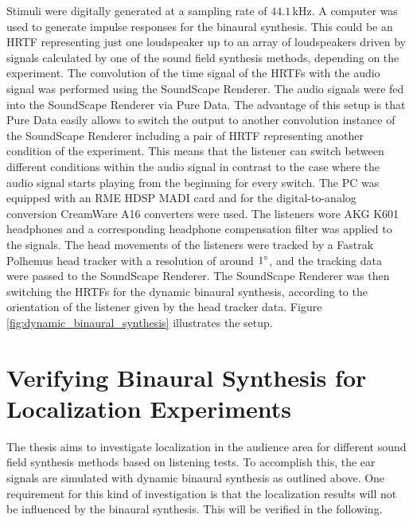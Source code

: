 Stimuli were digitally generated at a sampling rate of $44.1$\,kHz.
A computer was used to
generate impulse responses for the binaural synthesis. This could be an \ac{HRTF}
representing just one loudspeaker up to an array of loudspeakers driven by
signals calculated by one of the sound field synthesis methods,
depending on the experiment.
The convolution of the time signal of the \acp{HRTF} with
the audio signal was performed using the SoundScape
Renderer.\autocite[The \href{http://spatialaudio.net/ssr/}{\color{link}SoundScape
Renderer} is an open source software and is described in][]{Geier2008}
The audio signals were fed into the SoundScape Renderer via Pure
Data.\autocite[\href{http://puredata.info/}{\color{link}Pure Data} is an open
source software and first described in][]{Puckette1996}
The advantage of this setup is that Pure Data easily allows
to switch the output to another convolution instance of the SoundScape Renderer
including a pair of \ac{HRTF} representing another condition of the experiment. This
means that the listener can switch between different conditions within the
audio signal in contrast to the case where the audio signal starts playing from
the beginning for every switch.
The {\small PC} was equipped with an {\small RME HDSP MADI} card and for the
digital-to-analog conversion CreamWare A16 converters were used.
The listeners wore {\small AKG K601} headphones and a corresponding
headphone compensation filter was applied to the signals.
The head movements of the listeners were tracked by a Fastrak
Polhemus head tracker with a resolution of around $1^\circ$, and the tracking
data were passed to the SoundScape Renderer.
The SoundScape Renderer was then switching the \acp{HRTF} for the dynamic binaural
synthesis, according to the
orientation of the listener given by the head tracker data.
Figure\,\ref{fig:dynamic_binaural_synthesis} illustrates the setup.

\newpage


\section[Localization Experiments]{Verifying Binaural Synthesis for Localization
Experiments\autocite[Parts of this section are published
in][]{Wierstorf2012b,Wierstorf2013b}}
\label{sec:verifying_binaural_synthesis_for_localization_experiments}

The thesis aims to investigate localization in the audience area for different sound
field synthesis methods based on listening tests. To accomplish this, the ear signals
are simulated with dynamic binaural synthesis as outlined above. One requirement for this
kind of investigation is that the localization results will not be influenced by
the binaural synthesis. This will be verified in the following.

